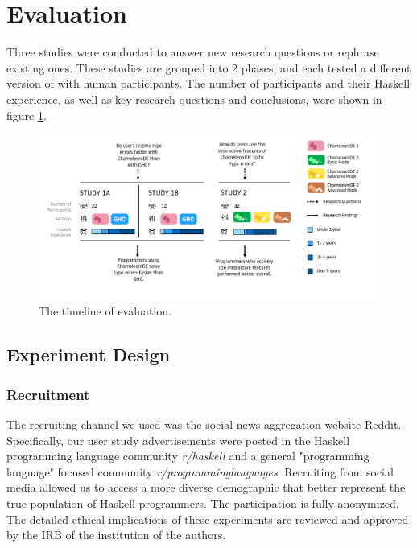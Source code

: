 \section{Evaluation}

Three studies were conducted to answer new research questions or rephrase existing ones. These studies are grouped into 2 phases, and each tested a different version of \chameleon{} with human participants. The number of participants and their Haskell experience, as well as key research questions and conclusions, were shown in figure \ref{fig:timeline}. 


\begin{figure}
    \centering
    \includegraphics[width=\textwidth]{images/timeline.pdf}
    \caption{The timeline of \chameleon{}  evaluation.}
    \label{fig:timeline}
\end{figure}

\subsection{Experiment Design}
\subsubsection*{\textbf{Recruitment}}

The recruiting channel we used was the social news aggregation website Reddit. Specifically, our user study advertisements were posted in the Haskell programming language community \textit{r/haskell} and a general "programming language" focused community \textit{r/programminglanguages}. Recruiting from social media allowed us to access a more diverse demographic that better represent the true population of Haskell programmers. The participation is fully anonymized. The detailed ethical implications of these experiments are reviewed and approved by the IRB of the institution of the authors.

